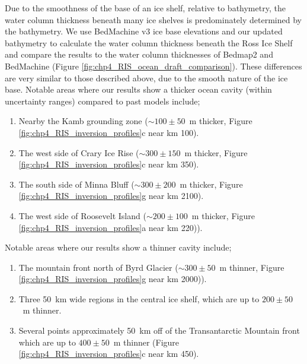 Due to the smoothness of the base of an ice shelf, relative to bathymetry, the water column thickness beneath many ice shelves is predominately determined by the bathymetry. We use BedMachine v3 ice base elevations and our updated bathymetry to calculate the water column thickness beneath the Ross Ice Shelf and compare the results to the water column thicknesses of Bedmap2 and BedMachine (Figure \ref{fig:chp4_RIS_ocean_draft_comparison}). These differences are very similar to those described above, due to the smooth nature of the ice base. Notable areas where our results show a thicker ocean cavity (within uncertainty ranges) compared to past models include;
\begin{enumerate}
    \item 
    Nearby the Kamb grounding zone ($\sim100\pm50$~m thicker, Figure \ref{fig:chp4_RIS_inversion_profiles}c near km 100).
    \item 
    The west side of Crary Ice Rise ($\sim300\pm150$~m thicker, Figure \ref{fig:chp4_RIS_inversion_profiles}c near km 350).
    \item 
    The south side of Minna Bluff ($\sim300\pm200$~m thicker, Figure \ref{fig:chp4_RIS_inversion_profiles}g near km 2100).
    \item 
    The west side of Roosevelt Island ($\sim200\pm100$~m thicker, Figure \ref{fig:chp4_RIS_inversion_profiles}a near km 220)).
\end{enumerate}

Notable areas where our results show a thinner cavity include;
\begin{enumerate}
    \item 
    The mountain front north of Byrd Glacier ($\sim300\pm50$~m thinner, Figure \ref{fig:chp4_RIS_inversion_profiles}g near km 2000)).
    \item 
    Three 50~km wide regions in the central ice shelf, which are up to $200\pm50$~m thinner.
    \item 
    Several points approximately 50~km off of the Transantarctic Mountain front which are up to $400\pm50$~m thinner (Figure \ref{fig:chp4_RIS_inversion_profiles}c near km 450).
\end{enumerate}

